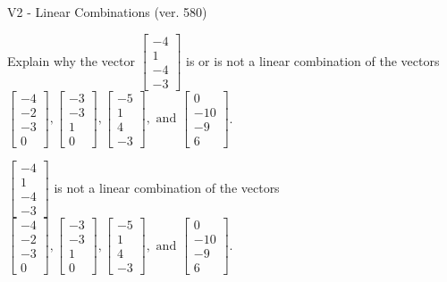\begin{exercise}
  \begin{exerciseTitle}V2 - Linear Combinations (ver. 580)\end{exerciseTitle}
  \begin{exerciseStatement}
    Explain why the vector \(\left[\begin{array}{c}
-4 \\
1 \\
-4 \\
-3
\end{array}\right]\)  is or is not a linear 
	combination of the vectors \(\left[\begin{array}{c}
-4 \\
-2 \\
-3 \\
0
\end{array}\right] , \left[\begin{array}{c}
-3 \\
-3 \\
1 \\
0
\end{array}\right] , \left[\begin{array}{c}
-5 \\
1 \\
4 \\
-3
\end{array}\right] , \text{ and } \left[\begin{array}{c}
0 \\
-10 \\
-9 \\
6
\end{array}\right]\).
	


  \end{exerciseStatement}
  \begin{exerciseAnswer}
   \(\left[\begin{array}{c}
-4 \\
1 \\
-4 \\
-3
\end{array}\right]\) 
  	 is not  
	a linear combination of the vectors \(\left[\begin{array}{c}
-4 \\
-2 \\
-3 \\
0
\end{array}\right] , \left[\begin{array}{c}
-3 \\
-3 \\
1 \\
0
\end{array}\right] , \left[\begin{array}{c}
-5 \\
1 \\
4 \\
-3
\end{array}\right] , \text{ and } \left[\begin{array}{c}
0 \\
-10 \\
-9 \\
6
\end{array}\right]\).


\end{exerciseAnswer}
\end{exercise}
